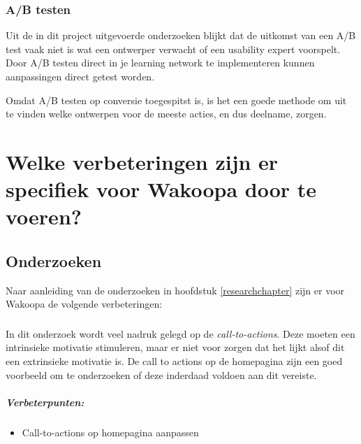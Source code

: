 \documentclass[a4paper, 10pt, pdftex]{report}
\begin{document}
    \subsection{A/B testen}
      Uit de in dit project uitgevoerde onderzoeken blijkt dat de uitkomst van een A/B test vaak niet is wat een ontwerper verwacht of een usability expert voorspelt. Door A/B testen direct in je learning network te implementeren kunnen aanpassingen direct getest worden.

      Omdat A/B testen op conversie toegespitst is, is het een goede methode om uit te vinden welke ontwerpen voor de meeste acties, en dus deelname, zorgen.

  \newpage
  \chapter{Welke verbeteringen zijn er specifiek voor Wakoopa door te voeren?}
    \newpage

    \section{Onderzoeken}
    Naar aanleiding van de onderzoeken in hoofdstuk \ref{researchchapter} zijn er voor Wakoopa de volgende verbeteringen:

 \subsection{\cite{Beenen2004}}
      In dit onderzoek wordt veel nadruk gelegd op de \emph{call-to-actions}. Deze moeten een intrinsieke motivatie stimuleren, maar er niet voor zorgen dat het lijkt alsof dit een extrinsieke motivatie is. De call to actions op de homepagina zijn een goed voorbeeld om te onderzoeken of deze inderdaad voldoen aan dit vereiste.

      \paragraph{\textbf{Verbeterpunten:}}
      \begin{itemize}
        \item Call-to-actions op homepagina aanpassen
      \end{itemize}
\end{document}
